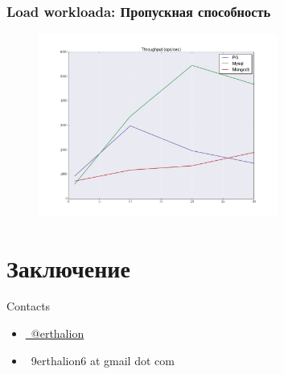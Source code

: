 \documentclass[14pt, compress, aspectratio=169]{beamer}
\def\twitter{{\FA \faTwitter}}
\def\email{{\FA \faEnvelope}}
\begin{document}
\begin{frame}[fragile]
    \frametitle{Load workloada: Пропускная способность}
    \vspace{-35pt}
    \begin{figure}
        \includegraphics[width=0.7\textwidth,center]{load_throughput.png}
    \end{figure}
\end{frame}

\section{Заключение}

\begin{frame}{Contacts}
    \begin{itemize}[label={}]
        \item \href{http://twitter.com/erthalion}{\twitter\ @erthalion}
        \item \email\ 9erthalion6 at gmail dot com
    \end{itemize}
\end{frame}

\end{document}
